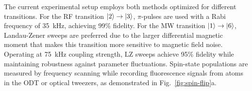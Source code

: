 The current experimental setup employs both methods optimized for different transitions. For the RF transition $\left| 2 \right\rangle \to \left| 3 \right\rangle$, $\pi$-pulses are used with a Rabi frequency of 35~kHz, achieving 99\% fidelity. For the MW transition $\left| 1 \right\rangle \to \left| 6 \right\rangle$, Landau-Zener sweeps are preferred due to the larger differential magnetic moment that makes this transition more sensitive to magnetic field noise. Operating at 75~kHz coupling strength, LZ sweeps achieve 95\% fidelity while maintaining robustness against parameter fluctuations.
Spin-state populations are measured by frequency scanning while recording fluorescence signals from atoms in the ODT or optical tweezers, as demonstrated in Fig.~\ref{fig:spin-flip}a.